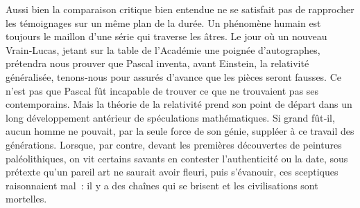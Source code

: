 \documentclass[french,twoside]{book} %
\newcommand{\astermono}{\medskip\centerline{\color{rubric}\large\selectfont{\syms ✻}}\medskip\par}%
\begin{document}
Aussi bien la comparaison critique bien entendue ne se satisfait pas  
\label{p59} de rapprocher les témoignages sur un même plan de la durée. Un phéno­mène humain est toujours le maillon d’une série qui traverse les âtres. Le jour où un nouveau Vrain‑Lucas, jetant sur la table de l’Académie une poignée d’autographes, prétendra nous prouver que Pascal inventa, avant Einstein, la relativité généralisée, tenons‑nous pour assurés d’a­vance que les pièces seront fausses. Ce n’est pas que Pascal fût incapable de trouver ce que ne trouvaient pas ses contemporains. Mais la théorie de la relativité prend son point de départ dans un long développement antérieur de spéculations mathématiques. Si grand fût‑il, aucun homme ne pouvait, par la seule force de son génie, suppléer à ce travail des géné­rations. Lorsque, par contre, devant les premières découvertes de pein­tures paléolithiques, on vit certains savants en contester l’authenticité ou la date, sous prétexte qu’un pareil art ne saurait avoir fleuri, puis s’évanouir, ces sceptiques raisonnaient mal : il y a des chaînes qui se brisent et les civilisations sont mortelles.\par

\astermono
\end{document}
